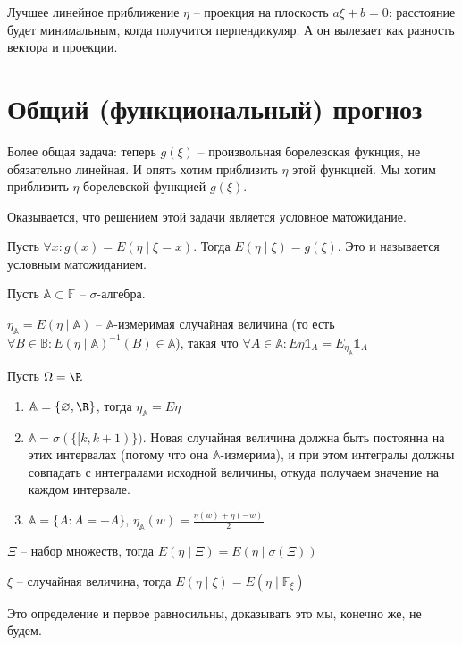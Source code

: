 Лучшее линейное приближение $\eta$ -- проекция на плоскость $a\xi + b = 0$: расстояние будет минимальным, когда получится перпендикуляр.
А он вылезает как разность вектора и проекции. 


\section{Общий (функциональный) прогноз}

Более общая задача: теперь $g(\xi)$ -- произвольная борелевская фукнция, не обязательно линейная.
И опять хотим приблизить $\eta$ этой функцией.    
Мы хотим приблизить $\eta$ борелевской функцией $g(\xi)$.

Оказывается, что решением этой задачи является условное матожидание.

\begin{Def}
Пусть $\forall x\colon g(x) = E(\eta \mid \xi = x)$. Тогда $E(\eta \mid \xi) = g(\xi)$. Это и называется условным матожиданием.
\end{Def}

\begin{Def}
    Пусть $\mathbb{A} \subset \mathbb{F}$ -- $\sigma$-алгебра.

    $\eta_\mathbb{A} = E(\eta \mid \mathbb{A})$ -- $\mathbb{A}$-измеримая случайная величина (то есть $\forall B \in \mathbb{B}\colon E(\eta \mid \mathbb{A})^{-1}(B) \in \mathbb{A}$),
    такая что $\forall A \in \mathbb{A}\colon E\eta \mathbb{1}_A = E_{\eta_\mathbb{A}} \mathbb{1}_A$
\end{Def}
\begin{exmp}
    Пусть $\Omega = \R$
    \begin{enumerate}
    \item
        $\mathbb{A} = \{\varnothing, \R\}$, тогда $\eta_\mathbb{A} = E\eta$
    \item
        $\mathbb{A} = \sigma(\{[k, k + 1)\})$. Новая случайная величина должна быть постоянна на этих интервалах (потому что она $\mathbb{A}$-измерима), 
        и при этом интегралы должны совпадать с интегралами исходной величины, откуда получаем значение на каждом интервале.
    \item   
        $\mathbb{A} = \{A \colon A = -A\}$, $\eta_\mathbb{A}(w) = \frac{\eta(w) + \eta(-w)}{2}$
    \end{enumerate}
\end{exmp}

\begin{Def}
    $\Xi$ -- набор множеств, тогда $E(\eta \mid \Xi) = E(\eta \mid \sigma(\Xi))$

    $\xi$ -- случайная величина, тогда $E(\eta \mid \xi) = E(\eta \mid \mathbb{F}_\xi)$
\end{Def}
\begin{Rem}
    Это определение и первое равносильны, доказывать это мы, конечно же, не будем.
\end{Rem}